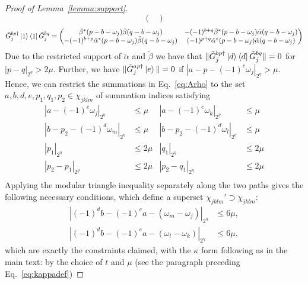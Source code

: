 \documentclass[aps,floatfix,10pt,amssymb,amsfont,amsmath,superscriptaddress,float,nofootinbib,longbibliography,nobalancelastpage,twocolumn]{revtex4-2}
\begin{document}
\begin{proof}[Proof of Lemma~\ref{lemma:support}]
\begin{equation}
\begin{pmatrix}
    \end{pmatrix}
\end{equation} 
\begin{equation}
    \tilde G^{bp\dagger}_{j}\ket{1}\bra{1} \tilde G^{bq}_{j} = \begin{pmatrix}
        \tilde \beta^*(p-b-\omega_{j})\tilde  \beta(q-b-\omega_{j}) &  -(-1)^{b+q}\tilde  \beta^*(p-b-\omega_{j})\tilde \alpha(q-b-\omega_{j}) \\
        -(-1)^{b+p}\tilde  \alpha^*(p-b-\omega_{j})\tilde  \beta(q-b-\omega_{j}) & (-1)^{p+q}\tilde  \alpha^*(p-b-\omega_{j})\tilde \alpha(q-b-\omega_{j})
    \end{pmatrix}
\end{equation} 
Due to the restricted support of $\tilde \alpha$ and $\tilde \beta$ we have that $\|\tilde G^{bp\dagger}_{j}\ket{d}\bra{d}\tilde G^{bq}_{j}\| = 0$ for $|p-q|_{2^{\eta}} > 2\mu$. Further, we have $\|\tilde G^{ap \dagger}_j \ket{e}\| = 0$ if $|a-p-(-1)^e\omega_{j}|_{2^{\eta}} > \mu$. Hence, we can restrict the summations in Eq.~\eqref{eq:Arho}  to the set $a,b,d,e,p_1,q_1,p_2 \in \chi_{jklm}$ of summation indices satisfying
\begin{equation}
\begin{aligned}
    |a-(-1)^e\omega_{j}|_{2^{\eta}} &\leq \mu  &|a-(-1)^e\omega_{k}|_{2^{\eta}} &\leq \mu\\
       |b-p_2-(-1)^{d}\omega_{m}|_{2^{\eta}}& \leq \mu&|b-p_2-(-1)^{d}\omega_{l}|_{2^{\eta}} &\leq \mu \\
    |p_1|_{2^{\eta}}&\leq 2\mu&  |q_1|_{2^{\eta}}&\leq 2\mu \\
    |p_2-p_1|_{2^{\eta}}&\leq 2\mu&  |p_2-q_1|_{2^{\eta}}&\leq 2\mu \\
\end{aligned}
\end{equation}
Applying the modular triangle inequality separately along the two paths gives the following necessary conditions, which define a superset $\chi_{jklm}'\supset\chi_{jklm}$:
\begin{equation}
\label{eq:condJ}
\begin{aligned}
    \left|(-1)^db -(-1)^ea-(\omega_{m}-\omega_{j})\right|_{2^{\eta}}&\leq 6\mu,\\
    \left|(-1)^db -(-1)^ea-(\omega_{l}-\omega_{k})\right|_{2^{\eta}}&\leq 6\mu,
\end{aligned}
\end{equation}
which are exactly the constraints claimed, with the $\kappa$ form following as in the main text: by the choice of $t$ and $\mu$ (see the paragraph preceding Eq.~\eqref{eq:kappadef})

\end{proof}
\end{document}
